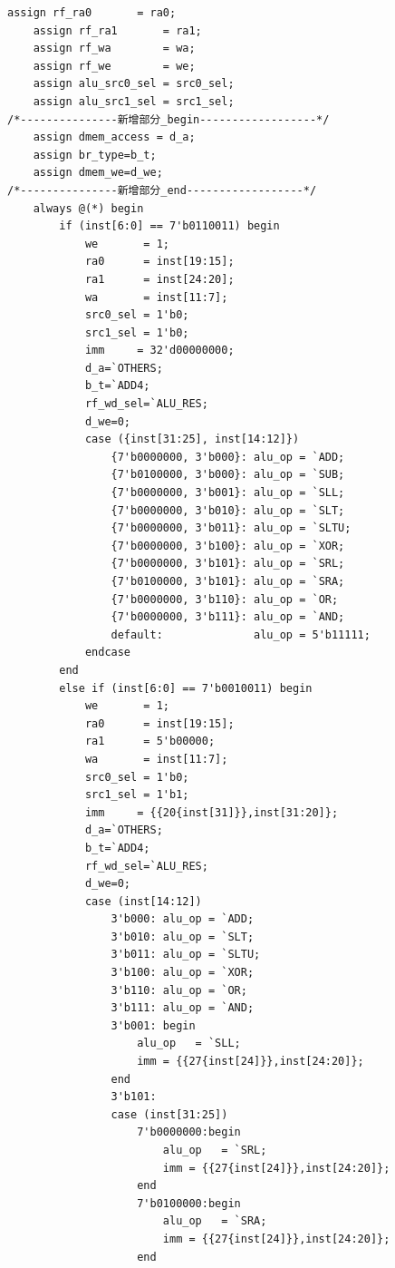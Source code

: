 \documentclass[12pt,a4paper]{ctexart}
\begin{document}
\begin{lstlisting}[style=verilog]
    assign rf_ra0       = ra0;
    assign rf_ra1       = ra1;
    assign rf_wa        = wa;
    assign rf_we        = we;
    assign alu_src0_sel = src0_sel;
    assign alu_src1_sel = src1_sel;
/*---------------新增部分_begin------------------*/
    assign dmem_access = d_a;
    assign br_type=b_t;
    assign dmem_we=d_we;
/*---------------新增部分_end------------------*/
    always @(*) begin
        if (inst[6:0] == 7'b0110011) begin
            we       = 1;
            ra0      = inst[19:15];
            ra1      = inst[24:20];
            wa       = inst[11:7];
            src0_sel = 1'b0;
            src1_sel = 1'b0;
            imm     = 32'd00000000;
            d_a=`OTHERS;
            b_t=`ADD4;
            rf_wd_sel=`ALU_RES;
            d_we=0;
            case ({inst[31:25], inst[14:12]})
                {7'b0000000, 3'b000}: alu_op = `ADD;
                {7'b0100000, 3'b000}: alu_op = `SUB;
                {7'b0000000, 3'b001}: alu_op = `SLL;
                {7'b0000000, 3'b010}: alu_op = `SLT;
                {7'b0000000, 3'b011}: alu_op = `SLTU;
                {7'b0000000, 3'b100}: alu_op = `XOR;
                {7'b0000000, 3'b101}: alu_op = `SRL;
                {7'b0100000, 3'b101}: alu_op = `SRA;
                {7'b0000000, 3'b110}: alu_op = `OR;
                {7'b0000000, 3'b111}: alu_op = `AND;
                default:              alu_op = 5'b11111;
            endcase
        end
        else if (inst[6:0] == 7'b0010011) begin
            we       = 1;
            ra0      = inst[19:15];
            ra1      = 5'b00000;
            wa       = inst[11:7];
            src0_sel = 1'b0;
            src1_sel = 1'b1;
            imm     = {{20{inst[31]}},inst[31:20]};
            d_a=`OTHERS;
            b_t=`ADD4;
            rf_wd_sel=`ALU_RES;
            d_we=0;
            case (inst[14:12])
                3'b000: alu_op = `ADD;
                3'b010: alu_op = `SLT;
                3'b011: alu_op = `SLTU;
                3'b100: alu_op = `XOR;
                3'b110: alu_op = `OR;
                3'b111: alu_op = `AND;
                3'b001: begin
                    alu_op   = `SLL;
                    imm = {{27{inst[24]}},inst[24:20]};
                end
                3'b101:
                case (inst[31:25])
                    7'b0000000:begin
                        alu_op   = `SRL;
                        imm = {{27{inst[24]}},inst[24:20]};
                    end
                    7'b0100000:begin
                        alu_op   = `SRA;
                        imm = {{27{inst[24]}},inst[24:20]};
                    end

\end{lstlisting}
\end{document}
